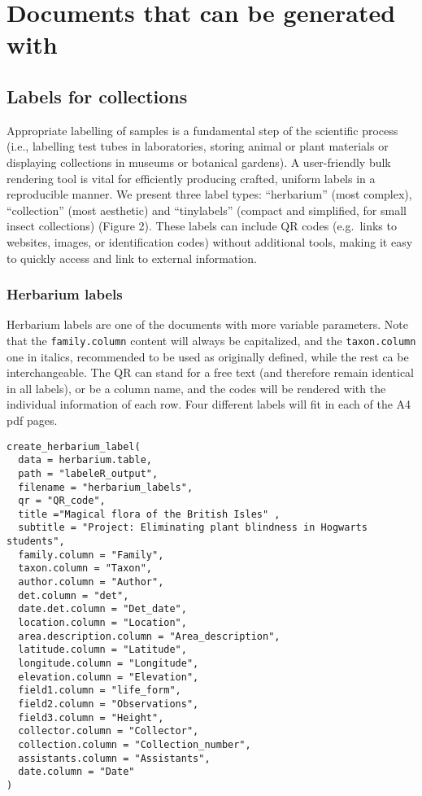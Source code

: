 \documentclass[draft,linenumbers]{agujournal2018}
\begin{document}
\section{Documents that can be generated with}

\subsection{Labels for collections}

Appropriate labelling of samples is a fundamental step of the scientific
process (i.e., labelling test tubes in laboratories, storing animal or
plant materials or displaying collections in museums or botanical
gardens). A user-friendly bulk rendering tool is vital for efficiently
producing crafted, uniform labels in a reproducible manner. We present
three label types: ``herbarium'' (most complex), ``collection'' (most
aesthetic) and ``tinylabels'' (compact and simplified, for small insect
collections) (Figure 2). These labels can include QR codes (e.g.~links
to websites, images, or identification codes) without additional tools,
making it easy to quickly access and link to external information.

\subsubsection{Herbarium labels}

Herbarium labels are one of the documents with more variable parameters.
Note that the \texttt{family.column} content will always be capitalized,
and the \texttt{taxon.column} one in italics, recommended to be used as
originally defined, while the rest ca be interchangeable. The QR can
stand for a free text (and therefore remain identical in all labels), or
be a column name, and the codes will be rendered with the individual
information of each row. Four different labels will fit in each of the
A4 pdf pages.

\begin{verbatim}
create_herbarium_label(
  data = herbarium.table,
  path = "labeleR_output",
  filename = "herbarium_labels",
  qr = "QR_code",
  title ="Magical flora of the British Isles" ,
  subtitle = "Project: Eliminating plant blindness in Hogwarts students",
  family.column = "Family",
  taxon.column = "Taxon",
  author.column = "Author",
  det.column = "det",
  date.det.column = "Det_date",
  location.column = "Location",
  area.description.column = "Area_description",
  latitude.column = "Latitude",
  longitude.column = "Longitude",
  elevation.column = "Elevation",
  field1.column = "life_form",
  field2.column = "Observations",
  field3.column = "Height",
  collector.column = "Collector",
  collection.column = "Collection_number",
  assistants.column = "Assistants",
  date.column = "Date"
)
\end{verbatim}
\end{document}
